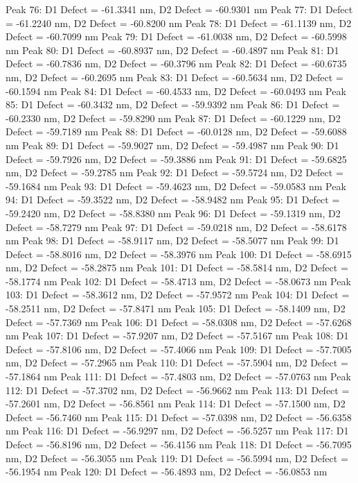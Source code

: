 \documentclass{article}
\begin{document}
Peak 76: D1 Defect = -61.3341 nm, D2 Defect = -60.9301 nm
Peak 77: D1 Defect = -61.2240 nm, D2 Defect = -60.8200 nm
Peak 78: D1 Defect = -61.1139 nm, D2 Defect = -60.7099 nm
Peak 79: D1 Defect = -61.0038 nm, D2 Defect = -60.5998 nm
Peak 80: D1 Defect = -60.8937 nm, D2 Defect = -60.4897 nm
Peak 81: D1 Defect = -60.7836 nm, D2 Defect = -60.3796 nm
Peak 82: D1 Defect = -60.6735 nm, D2 Defect = -60.2695 nm
Peak 83: D1 Defect = -60.5634 nm, D2 Defect = -60.1594 nm
Peak 84: D1 Defect = -60.4533 nm, D2 Defect = -60.0493 nm
Peak 85: D1 Defect = -60.3432 nm, D2 Defect = -59.9392 nm
Peak 86: D1 Defect = -60.2330 nm, D2 Defect = -59.8290 nm
Peak 87: D1 Defect = -60.1229 nm, D2 Defect = -59.7189 nm
Peak 88: D1 Defect = -60.0128 nm, D2 Defect = -59.6088 nm
Peak 89: D1 Defect = -59.9027 nm, D2 Defect = -59.4987 nm
Peak 90: D1 Defect = -59.7926 nm, D2 Defect = -59.3886 nm
Peak 91: D1 Defect = -59.6825 nm, D2 Defect = -59.2785 nm
Peak 92: D1 Defect = -59.5724 nm, D2 Defect = -59.1684 nm
Peak 93: D1 Defect = -59.4623 nm, D2 Defect = -59.0583 nm
Peak 94: D1 Defect = -59.3522 nm, D2 Defect = -58.9482 nm
Peak 95: D1 Defect = -59.2420 nm, D2 Defect = -58.8380 nm
Peak 96: D1 Defect = -59.1319 nm, D2 Defect = -58.7279 nm
Peak 97: D1 Defect = -59.0218 nm, D2 Defect = -58.6178 nm
Peak 98: D1 Defect = -58.9117 nm, D2 Defect = -58.5077 nm
Peak 99: D1 Defect = -58.8016 nm, D2 Defect = -58.3976 nm
Peak 100: D1 Defect = -58.6915 nm, D2 Defect = -58.2875 nm
Peak 101: D1 Defect = -58.5814 nm, D2 Defect = -58.1774 nm
Peak 102: D1 Defect = -58.4713 nm, D2 Defect = -58.0673 nm
Peak 103: D1 Defect = -58.3612 nm, D2 Defect = -57.9572 nm
Peak 104: D1 Defect = -58.2511 nm, D2 Defect = -57.8471 nm
Peak 105: D1 Defect = -58.1409 nm, D2 Defect = -57.7369 nm
Peak 106: D1 Defect = -58.0308 nm, D2 Defect = -57.6268 nm
Peak 107: D1 Defect = -57.9207 nm, D2 Defect = -57.5167 nm
Peak 108: D1 Defect = -57.8106 nm, D2 Defect = -57.4066 nm
Peak 109: D1 Defect = -57.7005 nm, D2 Defect = -57.2965 nm
Peak 110: D1 Defect = -57.5904 nm, D2 Defect = -57.1864 nm
Peak 111: D1 Defect = -57.4803 nm, D2 Defect = -57.0763 nm
Peak 112: D1 Defect = -57.3702 nm, D2 Defect = -56.9662 nm
Peak 113: D1 Defect = -57.2601 nm, D2 Defect = -56.8561 nm
Peak 114: D1 Defect = -57.1500 nm, D2 Defect = -56.7460 nm
Peak 115: D1 Defect = -57.0398 nm, D2 Defect = -56.6358 nm
Peak 116: D1 Defect = -56.9297 nm, D2 Defect = -56.5257 nm
Peak 117: D1 Defect = -56.8196 nm, D2 Defect = -56.4156 nm
Peak 118: D1 Defect = -56.7095 nm, D2 Defect = -56.3055 nm
Peak 119: D1 Defect = -56.5994 nm, D2 Defect = -56.1954 nm
Peak 120: D1 Defect = -56.4893 nm, D2 Defect = -56.0853 nm
\end{document}
